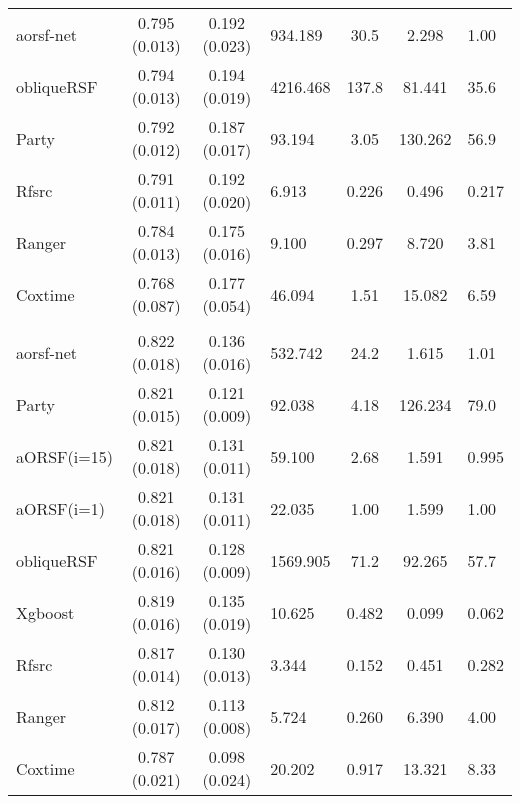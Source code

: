 \documentclass[twoside,11pt]{article}\usepackage[]{graphicx}\usepackage[]{color}
\newenvironment{knitrout}{}{} %
\begin{document}
\begin{knitrout}
\begin{longtable}{lcclccl}
\hspace{1em}aorsf-net & 0.795 (0.013) & 0.192 (0.023) & 934.189 & 30.5 & 2.298 & 1.00\\
\hspace{1em}obliqueRSF & 0.794 (0.013) & 0.194 (0.019) & 4216.468 & 137.8 & 81.441 & 35.6\\
\hspace{1em}Party & 0.792 (0.012) & 0.187 (0.017) & 93.194 & 3.05 & 130.262 & 56.9\\
\hspace{1em}Rfsrc & 0.791 (0.011) & 0.192 (0.020) & 6.913 & 0.226 & 0.496 & 0.217\\
\hspace{1em}Ranger & 0.784 (0.013) & 0.175 (0.016) & 9.100 & 0.297 & 8.720 & 3.81\\
\hspace{1em}Coxtime & 0.768 (0.087) & 0.177 (0.054) & 46.094 & 1.51 & 15.082 & 6.59\\
\addlinespace[0.3em]
\hline
\multicolumn{7}{l}{\textit{\textbf{sprint-cvd}}}\\
\hline
\hspace{1em}aorsf-net & 0.822 (0.018) & 0.136 (0.016) & 532.742 & 24.2 & 1.615 & 1.01\\
\hspace{1em}Party & 0.821 (0.015) & 0.121 (0.009) & 92.038 & 4.18 & 126.234 & 79.0\\
\hspace{1em}aORSF(i=15) & 0.821 (0.018) & 0.131 (0.011) & 59.100 & 2.68 & 1.591 & 0.995\\
\hspace{1em}aORSF(i=1) & 0.821 (0.018) & 0.131 (0.011) & 22.035 & 1.00 & 1.599 & 1.00\\
\hspace{1em}obliqueRSF & 0.821 (0.016) & 0.128 (0.009) & 1569.905 & 71.2 & 92.265 & 57.7\\
\hspace{1em}Xgboost & 0.819 (0.016) & 0.135 (0.019) & 10.625 & 0.482 & 0.099 & 0.062\\
\hspace{1em}Rfsrc & 0.817 (0.014) & 0.130 (0.013) & 3.344 & 0.152 & 0.451 & 0.282\\
\hspace{1em}Ranger & 0.812 (0.017) & 0.113 (0.008) & 5.724 & 0.260 & 6.390 & 4.00\\
\hspace{1em}Coxtime & 0.787 (0.021) & 0.098 (0.024) & 20.202 & 0.917 & 13.321 & 8.33\\

\end{longtable}
\end{knitrout}
\end{document}
